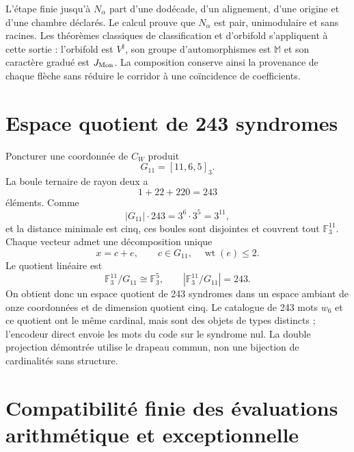 L'étape finie jusqu'à \(N_\alpha\) part d'une dodécade, d'un alignement, d'une
origine et d'une chambre déclarés. Le calcul prouve que \(N_\alpha\) est pair,
unimodulaire et sans racines. Les théorèmes classiques de
classification et d'orbifold s'appliquent à cette sortie : l'orbifold est \(V^\natural\), son groupe
d'automorphismes est \(\mathbb M\) et son caractère gradué est \(J_{\rm Mon}\).
La composition conserve ainsi la provenance de chaque flèche sans réduire le
corridor à une coïncidence de coefficients.

\section{Espace quotient de 243 syndromes}

Poncturer une coordonnée de \(C_W\) produit
\[
G_{11}=[11,6,5]_3.
\]
La boule ternaire de rayon deux a
\[
1+22+220=243
\]
éléments. Comme
\[
|G_{11}|\cdot243=3^6\cdot3^5=3^{11},
\]
et la distance minimale est cinq, ces boules sont disjointes et couvrent tout
\(\mathbb F_3^{11}\). Chaque vecteur admet une décomposition unique
\[
x=c+e,
\qquad
c\in G_{11},
\quad
\operatorname{wt}(e)\le2.
\]
Le quotient linéaire est
\[
\mathbb F_3^{11}/G_{11}\cong\mathbb F_3^5,
\qquad
|\mathbb F_3^{11}/G_{11}|=243.
\]
On obtient donc un espace quotient de 243 syndromes dans un espace ambiant de onze
coordonnées et de dimension quotient cinq. Le catalogue de 243 mots \(w_6\)
et ce quotient ont le même cardinal, mais sont des objets de types distincts ;
l'encodeur direct envoie les mots du code sur le syndrome nul. La double projection
démontrée utilise le drapeau commun, non une bijection de cardinalités sans
structure.

\section{Compatibilité finie des évaluations arithmétique et exceptionnelle}

